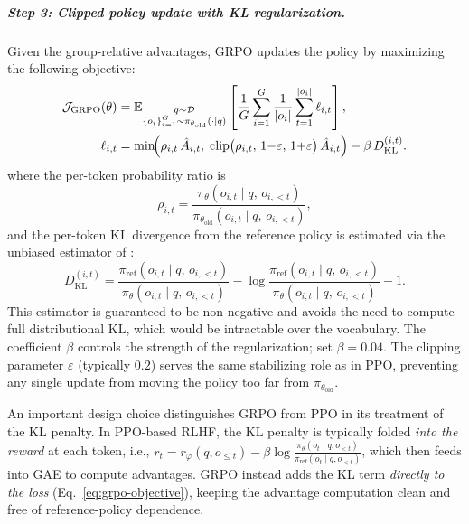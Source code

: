 \subparagraph{Step 3: Clipped policy update with KL regularization.}
Given the group-relative advantages, GRPO updates the policy by
maximizing the following objective:
\begin{equation}
\label{eq:grpo-objective}
\begin{aligned}
\mathcal{J}_{\text{GRPO}}(\theta)
  &= \mathbb{E}_{\substack{q \sim \mathcal{D}\\
      \{o_i\}_{i=1}^{G} \sim \pi_{\theta_{\text{old}}}(\cdot|q)}}
    \left[
      \frac{1}{G}\sum_{i=1}^{G}
      \frac{1}{|o_i|}\sum_{t=1}^{|o_i|}
      \ell_{i,t}
    \right],\\
\ell_{i,t}
  &=
      \min\!\Bigl(
        \rho_{i,t}\,\hat{A}_{i,t},\;
        \operatorname{clip}\bigl(\rho_{i,t},\,
          1{-}\varepsilon,\,1{+}\varepsilon\bigr)\,\hat{A}_{i,t}
      \Bigr)
      - \beta\, D_{\mathrm{KL}}^{(i,t)} .
\end{aligned}
\end{equation}
where the per-token probability ratio is
\begin{equation}
\label{eq:grpo-ratio}
\rho_{i,t}
  = \frac{\pi_\theta(o_{i,t} \mid q,\, o_{i,<t})}
         {\pi_{\theta_{\text{old}}}(o_{i,t} \mid q,\, o_{i,<t})},
\end{equation}
and the per-token KL divergence from the reference policy is estimated via
the unbiased estimator of \cite{schulman2017ppo}:
\begin{equation}
\label{eq:grpo-kl}
D_{\mathrm{KL}}^{(i,t)}
  = \frac{\pi_{\text{ref}}(o_{i,t} \mid q,\, o_{i,<t})}
         {\pi_\theta(o_{i,t} \mid q,\, o_{i,<t})}
  - \log\frac{\pi_{\text{ref}}(o_{i,t} \mid q,\, o_{i,<t})}
             {\pi_\theta(o_{i,t} \mid q,\, o_{i,<t})}
  - 1.
\end{equation}
This estimator is guaranteed to be non-negative and avoids the need to
compute full distributional KL, which would be intractable over the
vocabulary.  The coefficient $\beta$ controls the strength of the
regularization; \cite{shao2024deepseekmath} set $\beta = 0.04$.  The
clipping parameter $\varepsilon$ (typically $0.2$) serves the same
stabilizing role as in PPO, preventing any single update from moving the
policy too far from $\pi_{\theta_{\text{old}}}$.

An important design choice distinguishes GRPO from PPO in its treatment of
the KL penalty.  In PPO-based RLHF, the KL penalty is typically folded
\emph{into the reward} at each token, i.e.,
$r_t = r_\varphi(q, o_{\leq t}) - \beta \log
\frac{\pi_\theta(o_t \mid q, o_{<t})}{\pi_{\text{ref}}(o_t \mid q, o_{<t})}$,
which then feeds into GAE to compute advantages.  GRPO instead adds the KL
term \emph{directly to the loss} (Eq.~\ref{eq:grpo-objective}), keeping the
advantage computation clean and free of reference-policy dependence.

